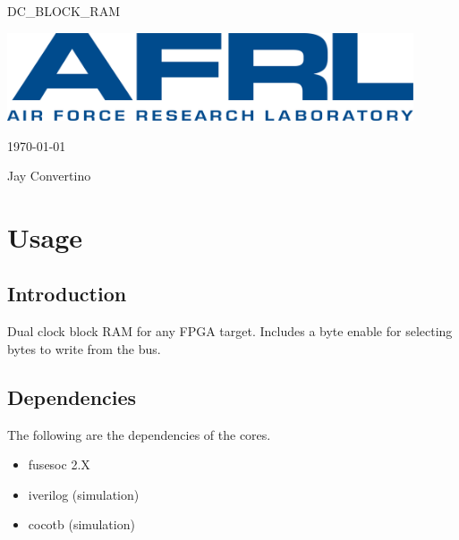 \begin{titlepage}
  \begin{center}

  {\Huge DC\_BLOCK\_RAM}

  \vspace{25mm}

  \includegraphics[width=0.90\textwidth,height=\textheight,keepaspectratio]{img/AFRL.png}

  \vspace{25mm}

  \today

  \vspace{15mm}

  {\Large Jay Convertino}

  \end{center}
\end{titlepage}

\tableofcontents

\newpage

\section{Usage}

\subsection{Introduction}

\par
Dual clock block RAM for any FPGA target. Includes a byte enable for selecting bytes to write from the bus.

\subsection{Dependencies}

\par
The following are the dependencies of the cores.

\begin{itemize}
  \item fusesoc 2.X
  \item iverilog (simulation)
  \item cocotb (simulation)
\end{itemize}

